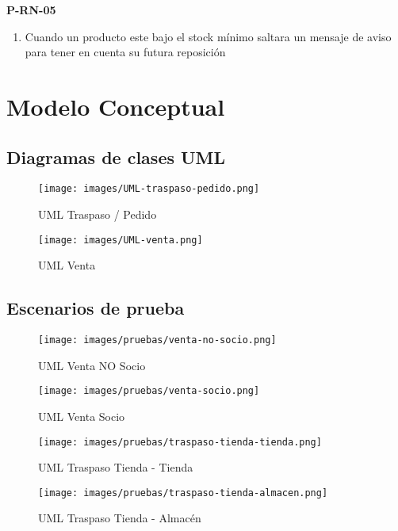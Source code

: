 \textbf{P-RN-05}
\begin{enumerate}
	\item Cuando un producto este bajo el stock mínimo saltara un mensaje de aviso para tener en cuenta su futura reposición 
\end{enumerate}

\section{Modelo Conceptual}
\subsection{Diagramas de clases UML}

\begin{figure}[H]
	\texttt{[image: images/UML-traspaso-pedido.png]}
	\caption{UML Traspaso / Pedido}
\end{figure}

\begin{figure}[H]
	\texttt{[image: images/UML-venta.png]}
	\caption{UML Venta}
\end{figure}

\subsection{Escenarios de prueba}

\begin{figure}[H]
	\texttt{[image: images/pruebas/venta-no-socio.png]}
	\caption{UML Venta NO Socio}
\end{figure}

\begin{figure}[H]
	\texttt{[image: images/pruebas/venta-socio.png]}
	\caption{UML Venta Socio}
\end{figure}

\begin{figure}[H]
	\texttt{[image: images/pruebas/traspaso-tienda-tienda.png]}
	\caption{UML Traspaso Tienda - Tienda}
\end{figure}

\begin{figure}[H]
	\texttt{[image: images/pruebas/traspaso-tienda-almacen.png]}
	\caption{UML Traspaso Tienda - Almacén}
\end{figure}

